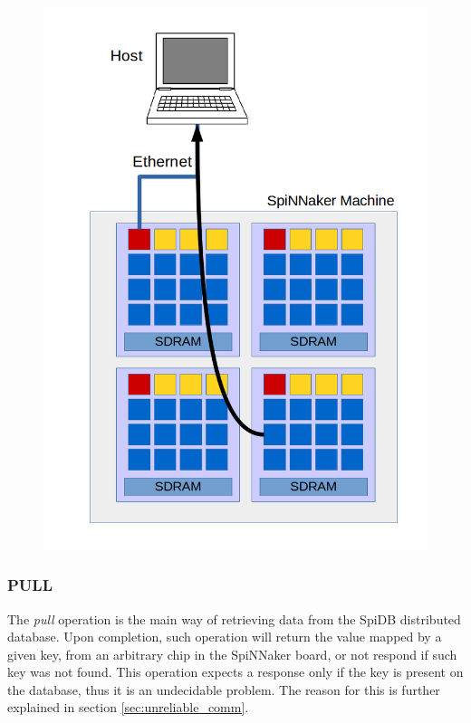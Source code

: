 \begin{figure}
\begin{minipage}{.32\textwidth}
  \includegraphics[width=1\linewidth, natwidth=794, natheight=1123]{images/put3.png}
  \label{fig:leaf-host}
\end{minipage}
\end{figure}


\subsubsection{PULL}
The \textit{pull} operation is the main way of retrieving data from the SpiDB distributed database. 
Upon completion, such operation will return the value mapped by a given key, from an arbitrary chip in the SpiNNaker board, or not respond if such key was not found. This operation expects a response only if the key is present on the database, thus it is an undecidable problem. The reason for this is further explained in section \ref{sec:unreliable_comm}.

